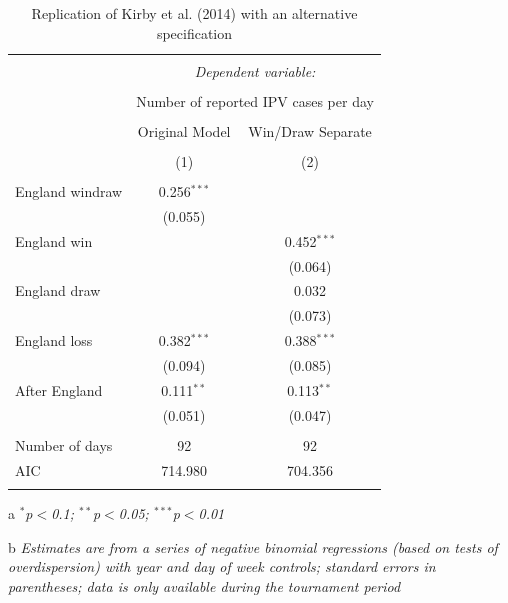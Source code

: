 \documentclass[12pt, letterpaper]{article}
\begin{document}
{\begin{table}[htp]
\centering
 \caption{Replication of Kirby et al. (2014) with an alternative specification}
   \label{kirbyrep1}
 \begin{threeparttable}
\begin{tabular}{@{\extracolsep{5pt}}lcc} 
\\[-1.8ex]\hline 
\hline \\[-1.8ex] 
 & \multicolumn{2}{c}{\textit{Dependent variable:}} \\ 
\cline{2-3} 
\\[-1.8ex] & \multicolumn{2}{c}{Number of reported IPV cases per day} \\ 
\\ 
 & Original Model & Win/Draw Separate \\ 
\\[-1.8ex] & (1) & (2)\\ 
\hline \\[-1.8ex] 
 England windraw & 0.256$^{***}$ &  \\ 
  & (0.055) &  \\ 
  England win &  & 0.452$^{***}$ \\ 
  &  & (0.064) \\ 
  England draw &  & 0.032 \\ 
  &  & (0.073) \\ 
  England loss & 0.382$^{***}$ & 0.388$^{***}$ \\ 
  & (0.094) & (0.085) \\ 
  After England & 0.111$^{**}$ & 0.113$^{**}$ \\ 
  & (0.051) & (0.047) \\ 
 \hline \\[-1.8ex] 
Number of days & 92 & 92 \\ 
AIC & 714.980 & 704.356 \\ 
\hline \\[-1.8ex] 
\end{tabular} 
\begin{tablenotes}
      \item[a] \textit{$^{*}$p$<$0.1; $^{**}$p$<$0.05; $^{***}$p$<$0.01}
      \item[b] \textit{Estimates are from a series of negative binomial regressions (based on tests of overdispersion) with year and day of week controls; standard errors in parentheses; data is only available during the tournament period}
    \end{tablenotes}
\end{threeparttable} 
\end{table}

}
\end{document}
